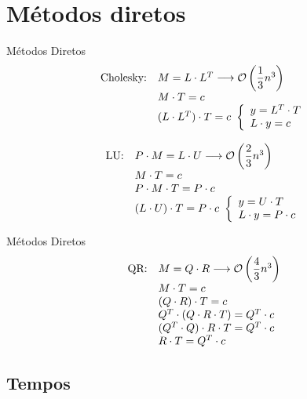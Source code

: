 \documentclass[11pt]{beamer}
\begin{document}
\section{Métodos diretos}

\begin{frame}{Métodos Diretos}
    \[\begin{array}{ll}
        \text{Cholesky:} & M = L\cdot L^T \longrightarrow {\cal{O}}\left(\dfrac{1}{3}n^3\right)\\
        & M\cdot T = c\\
        & (L\cdot L^T)\cdot T = c\ \left\{ \begin{array}{l}
            y = L^T \cdot T\\
            L\cdot y = c
        \end{array} \right.
    \end{array}\]

    \phantom{}

    \[\begin{array}{ll}
        \text{LU:} & P\cdot M = L\cdot U \longrightarrow {\cal{O}}\left(\dfrac{2}{3}n^3\right)\\
        & M\cdot T = c\\
        & P \cdot M\cdot T = P \cdot c\\
        & (L \cdot U)\cdot T = P \cdot c\ \left\{ \begin{array}{l}
            y = U \cdot T\\
            L\cdot y = P \cdot c
        \end{array} \right.
    \end{array}\]
\end{frame}

\begin{frame}{Métodos Diretos}
    \[\begin{array}{ll}
        \text{QR:} & M = Q\cdot R \longrightarrow {\cal{O}}\left(\dfrac{4}{3}n^3\right)\\
        & M\cdot T = c\\
        & (Q\cdot R)\cdot T = c\\
        & Q^T \cdot (Q\cdot R\cdot T) = Q^T \cdot c\\
        & (Q^T \cdot Q) \cdot R\cdot T = Q^T \cdot c\\
        & R \cdot T = Q^T \cdot c
    \end{array}\]
\end{frame}

\subsection{Tempos}
\end{document}
